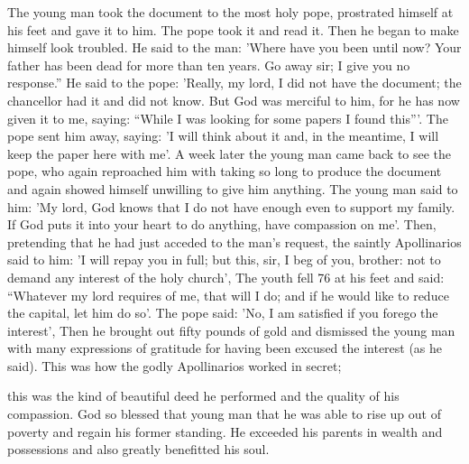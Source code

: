 The young man took the document to the most holy pope,
prostrated himself at his feet and gave it to him.
The pope took it
and read it.
Then he began to make himself look troubled.
He said
to the man: 'Where have you been until now? Your father has been
dead for more than ten years.
Go away sir; I give you no response.”
He said to the pope: 'Really, my lord, I did not have the document;
the chancellor had it and did not know.
But God was merciful to
him, for he has now given it to me, saying: “While I was looking for
some papers I found this”'.
The pope sent him away, saying: 'I will
think about it and, in the meantime, I will keep the paper here with
me'.
A week later the young man came back to see the pope, who
again reproached him with taking so long to produce the document
and again showed himself unwilling to give him anything.
The
young man said to him: 'My lord, God knows that I do not have
enough even to support my family.
If God puts it into your heart
to do anything, have compassion on me'.
Then, pretending that he
had just acceded to the man's request, the saintly Apollinarios said
to him: 'I will repay you in full; but this, sir, I beg of you, brother:
not to demand any interest of the holy church', The youth fell 76
at his feet and said: “Whatever my lord requires of me, that will I
do; and if he would like to reduce the capital, let him do so'.
The
pope said: 'No, I am satisfied if you forego the interest', Then he
brought out fifty pounds of gold and dismissed the young man with
many expressions of gratitude for having been excused the interest
(as he said).
This was how the godly Apollinarios worked in secret;

this was the kind of beautiful deed he performed and the quality of
his compassion.
God so blessed that young man that he was able to
rise up out of poverty and regain his former standing.
He exceeded
his parents in wealth and possessions and also greatly benefitted his
soul.

